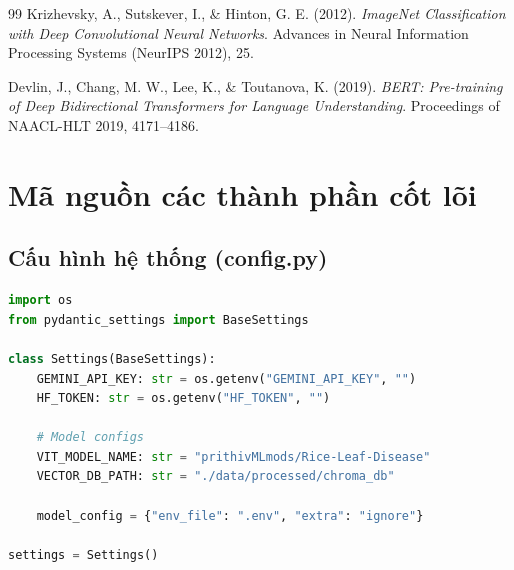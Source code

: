 \documentclass[13pt,a4paper]{extreport}
\begin{document}
\begin{thebibliography}{99}
Krizhevsky, A., Sutskever, I., \& Hinton, G. E. (2012). \textit{ImageNet Classification with Deep Convolutional Neural Networks}. Advances in Neural Information Processing Systems (NeurIPS 2012), 25.

Devlin, J., Chang, M. W., Lee, K., \& Toutanova, K. (2019). \textit{BERT: Pre-training of Deep Bidirectional Transformers for Language Understanding}. Proceedings of NAACL-HLT 2019, 4171--4186.

\end{thebibliography}

\appendix
\chapter{Mã nguồn các thành phần cốt lõi}

\section{Cấu hình hệ thống (config.py)}
\begin{lstlisting}[language=Python, caption={src/core/config.py --- Quản lý cấu hình bằng Pydantic Settings}, label={lst:config}]
import os
from pydantic_settings import BaseSettings

class Settings(BaseSettings):
    GEMINI_API_KEY: str = os.getenv("GEMINI_API_KEY", "")
    HF_TOKEN: str = os.getenv("HF_TOKEN", "")

    # Model configs
    VIT_MODEL_NAME: str = "prithivMLmods/Rice-Leaf-Disease"
    VECTOR_DB_PATH: str = "./data/processed/chroma_db"

    model_config = {"env_file": ".env", "extra": "ignore"}

settings = Settings()
\end{lstlisting}
\end{document}
